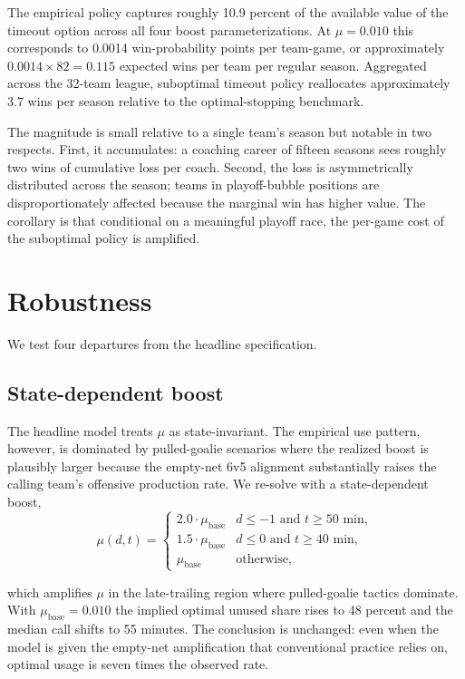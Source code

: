 \documentclass[11pt]{article}
\begin{document}
The empirical policy captures roughly 10.9 percent of the available value of the timeout option across all four boost parameterizations. At $\mu = 0.010$ this corresponds to 0.0014 win-probability points per team-game, or approximately $0.0014 \times 82 = 0.115$ expected wins per team per regular season. Aggregated across the 32-team league, suboptimal timeout policy reallocates approximately 3.7 wins per season relative to the optimal-stopping benchmark.

The magnitude is small relative to a single team's season but notable in two respects. First, it accumulates: a coaching career of fifteen seasons sees roughly two wins of cumulative loss per coach. Second, the loss is asymmetrically distributed across the season; teams in playoff-bubble positions are disproportionately affected because the marginal win has higher value. The corollary is that conditional on a meaningful playoff race, the per-game cost of the suboptimal policy is amplified.

\section{Robustness}\label{sec:robustness}

We test four departures from the headline specification.

\subsection{State-dependent boost}

The headline model treats $\mu$ as state-invariant. The empirical use pattern, however, is dominated by pulled-goalie scenarios where the realized boost is plausibly larger because the empty-net 6v5 alignment substantially raises the calling team's offensive production rate. We re-solve with a state-dependent boost,
\begin{equation}
\mu(d, t) = \begin{cases} 2.0 \cdot \mu_{\text{base}} & d \leq -1 \text{ and } t \geq 50\text{ min},\\ 1.5 \cdot \mu_{\text{base}} & d \leq 0 \text{ and } t \geq 40\text{ min},\\ \mu_{\text{base}} & \text{otherwise,} \end{cases}
\end{equation}

\noindent which amplifies $\mu$ in the late-trailing region where pulled-goalie tactics dominate. With $\mu_{\text{base}} = 0.010$ the implied optimal unused share rises to 48 percent and the median call shifts to 55 minutes. The conclusion is unchanged: even when the model is given the empty-net amplification that conventional practice relies on, optimal usage is seven times the observed rate.
\end{document}
